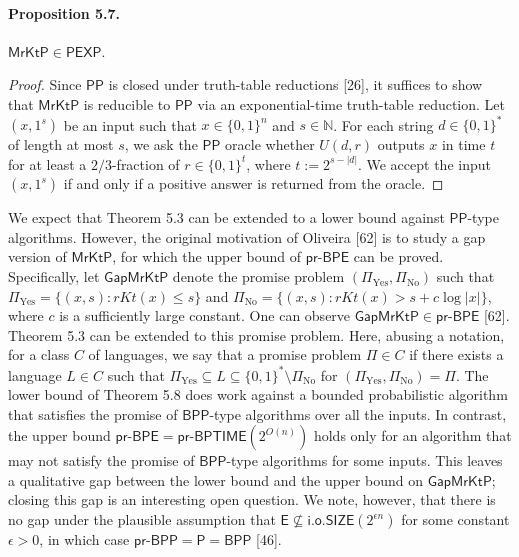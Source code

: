 \paragraph{Proposition 5.7.}
$\mathsf{MrKtP}\in\mathsf{PEXP}$.
\begin{proof}
Since $\mathsf{PP}$ is closed under truth-table reductions [26], it suffices to show that $\mathsf{MrKtP}$ is reducible to $\mathsf{PP}$ via an exponential-time truth-table reduction. Let $(x,1^s)$ be an input such that $x\in\{0,1\}^n$ and $s\in\mathbb N$. For each string $d\in\{0,1\}^*$ of length at most $s$, we ask the $\mathsf{PP}$ oracle whether $U(d,r)$ outputs $x$ in time $t$ for at least a $2/3$-fraction of $r\in\{0,1\}^t$, where $t:=2^{s-|d|}$. We accept the input $(x,1^s)$ if and only if a positive answer is returned from the oracle.
\end{proof}
We expect that Theorem 5.3 can be extended to a lower bound against $\mathsf{PP}$-type algorithms. However, the original motivation of Oliveira [62] is to study a gap version of $\mathsf{MrKtP}$, for which the upper bound of $\mathsf{pr\text{-}BPE}$ can be proved. Specifically, let $\mathsf{GapMrKtP}$ denote the promise problem $(\Pi_{\mathrm{Yes}},\Pi_{\mathrm{No}})$ such that $\Pi_{\mathrm{Yes}}=\{(x,s):rKt(x)\leq s\}$ and $\Pi_{\mathrm{No}}=\{(x,s):rKt(x)>s+c\log|x|\}$, where $c$ is a sufficiently large constant. One can observe $\mathsf{GapMrKtP}\in\mathsf{pr\text{-}BPE}$ [62]. Theorem 5.3 can be extended to this promise problem.
Here, abusing a notation, for a class $C$ of languages, we say that a promise problem $\Pi\in C$ if there exists a language $L\in C$ such that $\Pi_{\mathrm{Yes}}\subseteq L\subseteq\{0,1\}^*\setminus\Pi_{\mathrm{No}}$ for $(\Pi_{\mathrm{Yes}},\Pi_{\mathrm{No}})=\Pi$.
The lower bound of Theorem 5.8 does work against a bounded probabilistic algorithm that satisfies the promise of $\mathsf{BPP}$-type algorithms over all the inputs. In contrast, the upper bound $\mathsf{pr\text{-}BPE}=\mathsf{pr\text{-}BPTIME}(2^{O(n)})$ holds only for an algorithm that may not satisfy the promise of $\mathsf{BPP}$-type algorithms for some inputs. This leaves a qualitative gap between the lower bound and the upper bound on $\mathsf{GapMrKtP}$; closing this gap is an interesting open question. We note, however, that there is no gap under the plausible assumption that $\mathsf E\not\subseteq\mathsf{i.o.SIZE}(2^{\epsilon n})$ for some constant $\epsilon>0$, in which case $\mathsf{pr\text{-}BPP}=\mathsf P=\mathsf{BPP}$ [46].
